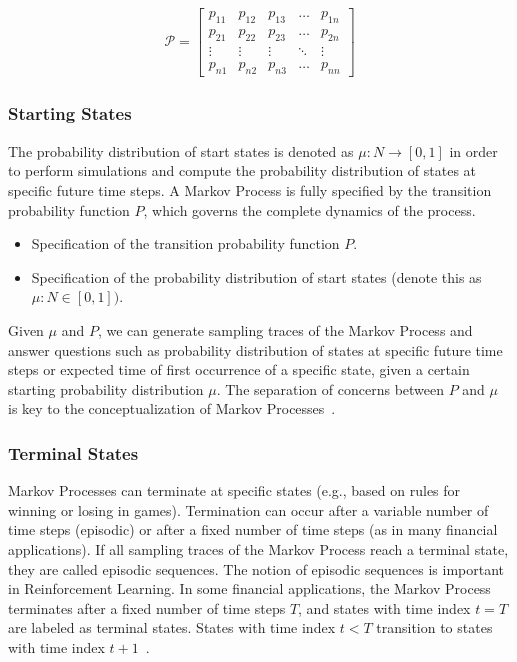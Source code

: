 \documentclass[../xlapes02]{subfiles}
\begin{document}
    \begin{align*}
        \mathcal{P}=\begin{bmatrix}
                        p_{11} & p_{12} & p_{13} & \dots  & p_{1n} \\
                        p_{21} & p_{22} & p_{23} & \dots  & p_{2n} \\
                        \vdots & \vdots & \vdots & \ddots & \vdots \\
                        p_{n1} & p_{n2} & p_{n3} & \dots  & p_{nn}
        \end{bmatrix}
    \end{align*}

    \subsubsection{Starting States}
    The probability distribution of start states is denoted as $\mu : N \rightarrow [0,1]$ in order to perform simulations and compute the probability distribution of states at specific future time steps. A Markov Process is fully specified by the transition probability function $P$, which governs the complete dynamics of the process.
    \begin{itemize}
        \item Specification of the transition probability function $P$.
        \item Specification of the probability distribution of start states (denote this as $\mu : N \in[0, 1])$.
    \end{itemize}
    Given $\mu$ and $P$, we can generate sampling traces of the Markov Process and answer questions such as probability distribution of states at specific future time steps or expected time of first occurrence of a specific state, given a certain starting probability distribution $\mu$. The separation of concerns between $P$ and $\mu$ is key to the conceptualization of Markov Processes~\cite{rao2022foundations}.

    \subsubsection{Terminal States}
    Markov Processes can terminate at specific states (e.g., based on rules for winning or losing in games). Termination can occur after a variable number of time steps (episodic) or after a fixed number of time steps (as in many financial applications). If all sampling traces of the Markov Process reach a terminal state, they are called episodic sequences. The notion of episodic sequences is important in Reinforcement Learning. In some financial applications, the Markov Process terminates after a fixed number of time steps $T$, and states with time index $t = T$ are labeled as terminal states. States with time index $t < T$ transition to states with time index $t + 1$~\cite{rao2022foundations}.
\end{document}
